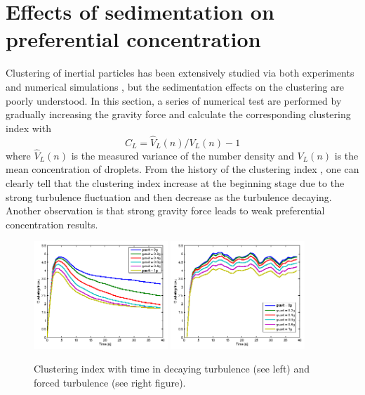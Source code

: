 \documentclass[12pt]{article}
\begin{document}
\section{Effects of sedimentation on preferential concentration }
Clustering of inertial particles has been extensively studied via both 
experiments and numerical simulations \cite{Sundaram97, Reade2000}, but the sedimentation effects on the clustering are poorly understood. In this section, a series of numerical test are performed by gradually increasing the 
gravity force and calculate the corresponding clustering index \cite{Vaillancourt02} with
\begin{equation}
C_L = \hat{V}_L(n)/V_L(n)-1
\label{eq:cluster_index}
\end{equation}
where $\hat{V}_L(n)$ is the measured variance of the number density and $V_L(n)$ is the mean concentration of droplets.
From the history of the clustering index , one can clearly tell that the clustering index increase at the beginning stage due to the strong turbulence fluctuation and then decrease as the turbulence decaying. Another observation is that strong gravity force leads to weak preferential concentration results.
\begin{figure}
\includegraphics[width=0.45\textwidth]{Figures/gravity_time_decay}
\includegraphics[width=0.45\textwidth]{Figures/gravity_time_force}
\caption{Clustering index with time in decaying turbulence (see left) and 
forced turbulence (see right figure).}
\label{fig:gravity_cluster}
\end{figure}
\end{document}
